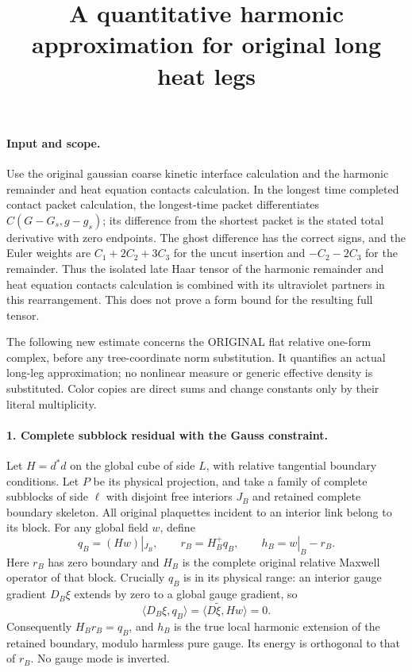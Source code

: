 \documentclass[11pt]{article}
\title{A quantitative harmonic approximation for original long heat legs}\author{}\date{}
\begin{document}
\maketitle
\paragraph{Input and scope.}
Use the original gaussian coarse kinetic interface calculation and the harmonic remainder and heat equation contacts calculation. In the longest time completed contact packet calculation, the
longest-time packet differentiates $C(G-G_s,g-g_s)$; its difference
from the shortest packet is the stated total derivative with zero
endpoints. The ghost difference has the correct signs, and the
Euler weights are $C_1+2C_2+3C_3$ for the uncut insertion and
$-C_2-2C_3$ for the remainder. Thus the isolated late Haar tensor of the harmonic remainder and heat equation contacts calculation
is combined with its ultraviolet partners in this rearrangement.
This does not prove a form bound for the resulting full tensor.

The following new estimate concerns the ORIGINAL flat relative
one-form complex, before any tree-coordinate norm substitution.
It quantifies an actual long-leg approximation; no nonlinear measure
or generic effective density is substituted. Color copies are direct
sums and change constants only by their literal multiplicity.

\paragraph{1. Complete subblock residual with the Gauss constraint.}
Let $H=d^*d$ on the global cube of side $L$, with relative tangential
boundary conditions. Let $P$ be its physical projection, and take a
family of complete subblocks of side $\ell$ with disjoint free
interiors $J_B$ and retained complete boundary skeleton. All original
plaquettes incident to an interior link belong to its block.
For any global field $w$, define
\[
 q_B=(Hw)|_{J_B},\qquad r_B=H_B^+q_B,\qquad h_B=w|_B-r_B.       \tag{1}
\]
Here $r_B$ has zero boundary and $H_B$ is the complete original
relative Maxwell operator of that block. Crucially $q_B$ is in its
physical range: an interior gauge gradient $D_B\xi$ extends by zero
to a global gauge gradient, so
\[
 \langle D_B\xi,q_B\rangle=\langle D\widetilde\xi,Hw\rangle=0.
\]
Consequently $H_Br_B=q_B$, and $h_B$ is the true local harmonic
extension of the retained boundary, modulo harmless pure gauge.
Its energy is orthogonal to that of $r_B$. No gauge mode is inverted.
\end{document}
